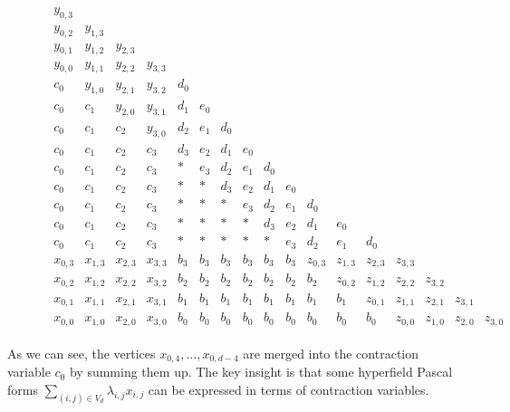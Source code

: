 \begin{figure}[H]
    \begin{align*}
        \begin{array}{cccccccccccccccccccc}
            y_{0,3} & & & & & & & & & & & & \\
            y_{0,2} & y_{1,3} & & & & & & & & & & & \\
            y_{0,1} & y_{1,2} & y_{2,3} & & & & & & & & & & \\
            y_{0,0} & y_{1,1} & y_{2,2} & y_{3,3} & & & & & & & & & \\
            c_0 & y_{1,0} & y_{2,1} & y_{3,2} & d_0 & & & & & & & & \\
            c_0 & c_1 & y_{2,0} & y_{3,1} & d_1 & e_0 & & & & & & & \\
            c_0 & c_1 & c_2 & y_{3,0} & d_2 & e_1 & d_0 & & & & & & \\
            c_0 & c_1 & c_2 & c_3 & d_3 & e_2 & d_1 & e_0 & & & & & \\
            c_0 & c_1 & c_2 & c_3 &  *  & e_3 & d_2 & e_1 & d_0 & & & & \\
            c_0 & c_1 & c_2 & c_3 &  *  & * & d_3 & e_2 & d_1 & e_0 & & & \\
            c_0 & c_1 & c_2 & c_3 &  *  & * & * & e_3 & d_2 & e_1 & d_0 & & \\
            c_0 & c_1 & c_2 & c_3 &  *  & * & * & * & d_3 & e_2 & d_1 & e_0 & \\
            c_0 & c_1 & c_2 & c_3 &  *  & * & * & * & * & e_3 & d_2 & e_1 & d_0 \\
            x_{0,3} & x_{1,3} & x_{2,3} & x_{3,3} & b_3 & b_3 & b_3 & b_3 & b_3 & b_3 & z_{0,3} & z_{1,3} & z_{2,3} & z_{3,3} \\
            x_{0,2} & x_{1,2} & x_{2,2} & x_{3,2} & b_2 & b_2 & b_2 & b_2 & b_2 & b_2 & b_2 & z_{0,2} & z_{1,2} & z_{2,2} & z_{3,2} \\
            x_{0,1} & x_{1,1} & x_{2,1} & x_{3,1} & b_1 & b_1 & b_1 & b_1 & b_1 & b_1 & b_1 & b_1 & z_{0,1} & z_{1,1} & z_{2,1} & z_{3,1} \\
            x_{0,0} & x_{1,0} & x_{2,0} & x_{3,0} & b_0 & b_0 & b_0 & b_0 & b_0 & b_0 & b_0 & b_0 & b_0 & z_{0,0} & z_{1,0} & z_{2,0} & z_{3,0}
        \end{array}
    \end{align*}  
\end{figure}

As we can see, the vertices \( x_{0,4}, \dots, x_{0, d-4} \) are merged into the contraction variable \( c_0 \) by summing them up. The key insight is that some hyperfield Pascal forms \( \sum_{(i,j) \in V_d} \lambda_{i,j} x_{i,j} \) can be expressed in terms of contraction variables.


